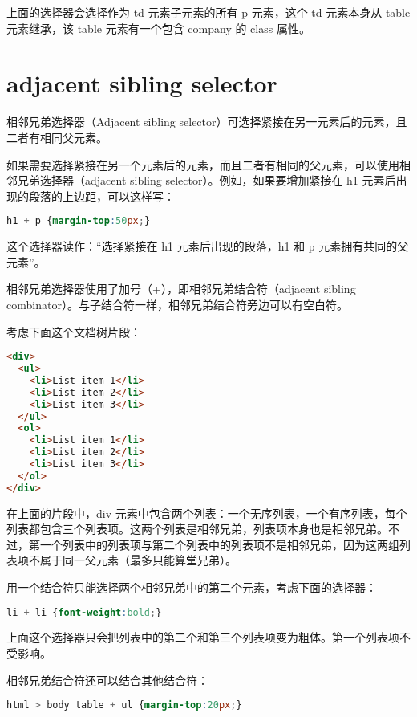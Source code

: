 上面的选择器会选择作为 td 元素子元素的所有 p 元素，这个 td 元素本身从 table 元素继承，该 table 元素有一个包含 company 的 class 属性。


\section{adjacent sibling selector}

相邻兄弟选择器（Adjacent sibling selector）可选择紧接在另一元素后的元素，且二者有相同父元素。

如果需要选择紧接在另一个元素后的元素，而且二者有相同的父元素，可以使用相邻兄弟选择器（adjacent sibling selector）。例如，如果要增加紧接在 h1 元素后出现的段落的上边距，可以这样写：

\begin{lstlisting}[language=CSS]
h1 + p {margin-top:50px;}
\end{lstlisting}

这个选择器读作：“选择紧接在 h1 元素后出现的段落，h1 和 p 元素拥有共同的父元素”。


相邻兄弟选择器使用了加号（+），即相邻兄弟结合符（adjacent sibling combinator）。与子结合符一样，相邻兄弟结合符旁边可以有空白符。

考虑下面这个文档树片段：


\begin{lstlisting}[language=HTML]
<div>
  <ul>
    <li>List item 1</li>
    <li>List item 2</li>
    <li>List item 3</li>
  </ul>
  <ol>
    <li>List item 1</li>
    <li>List item 2</li>
    <li>List item 3</li>
  </ol>
</div>
\end{lstlisting}

在上面的片段中，div 元素中包含两个列表：一个无序列表，一个有序列表，每个列表都包含三个列表项。这两个列表是相邻兄弟，列表项本身也是相邻兄弟。不过，第一个列表中的列表项与第二个列表中的列表项不是相邻兄弟，因为这两组列表项不属于同一父元素（最多只能算堂兄弟）。

用一个结合符只能选择两个相邻兄弟中的第二个元素，考虑下面的选择器：


\begin{lstlisting}[language=CSS]
li + li {font-weight:bold;}
\end{lstlisting}



上面这个选择器只会把列表中的第二个和第三个列表项变为粗体。第一个列表项不受影响。

相邻兄弟结合符还可以结合其他结合符：

\begin{lstlisting}[language=CSS]
html > body table + ul {margin-top:20px;}
\end{lstlisting}

